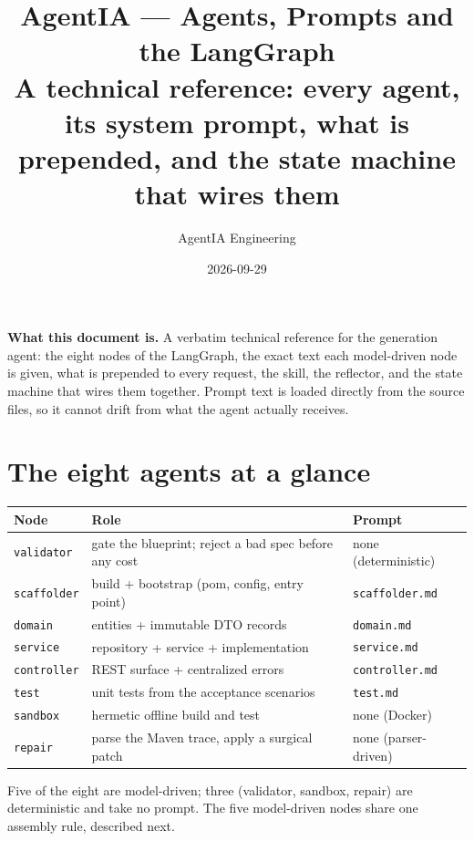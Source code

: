 \documentclass[11pt,a4paper]{article}
\title{\vspace{-1.4cm}\textbf{AgentIA --- Agents, Prompts and the LangGraph}\\[0.25cm]
\large A technical reference: every agent, its system prompt, what is prepended,
and the state machine that wires them}
\author{AgentIA Engineering}
\date{2026-09-29}
\begin{document}
\maketitle
\thispagestyle{fancy}

\begin{notebox}
\textbf{What this document is.} A verbatim technical reference for the generation
agent: the eight nodes of the LangGraph, the exact text each model-driven node is
given, what is prepended to every request, the skill, the reflector, and the state
machine that wires them together. Prompt text is loaded directly from the source
files, so it cannot drift from what the agent actually receives.
\end{notebox}

\tableofcontents
\vspace{0.4cm}

\section{The eight agents at a glance}

\begin{center}
\begin{longtable}{@{}p{}p{}p{}@{}}
\toprule
\textbf{Node} & \textbf{Role} & \textbf{Prompt} \\
\midrule
\texttt{validator} & gate the blueprint; reject a bad spec before any cost & none (deterministic) \\
\texttt{scaffolder} & build + bootstrap (pom, config, entry point) & \texttt{scaffolder.md} \\
\texttt{domain} & entities + immutable DTO records & \texttt{domain.md} \\
\texttt{service} & repository + service + implementation & \texttt{service.md} \\
\texttt{controller} & REST surface + centralized errors & \texttt{controller.md} \\
\texttt{test} & unit tests from the acceptance scenarios & \texttt{test.md} \\
\texttt{sandbox} & hermetic offline build and test & none (Docker) \\
\texttt{repair} & parse the Maven trace, apply a surgical patch & none (parser-driven) \\
\bottomrule
\end{longtable}
\end{center}

Five of the eight are model-driven; three (validator, sandbox, repair) are
deterministic and take no prompt. The five model-driven nodes share one assembly
rule, described next.
\end{document}
